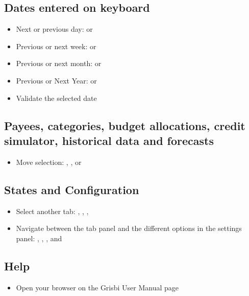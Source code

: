 \subsection{Dates entered on keyboard }

\begin{itemize}
	\item Next or previous day: \key{+} or \key{-}
	\item Previous or next week:  \key{+} or  \key{-}
	\item Previous or next month:  or 
	\item Previous or Next Year:   or  
	\item Validate the selected date 
\end{itemize}


\subsection{Payees, categories, budget allocations, credit simulator, historical data and forecasts}

\begin{itemize}
	\item Move selection: , ,  or 
\end{itemize}


\subsection{States and Configuration}

\begin{itemize}
	\item Select another tab: , , , 
	\item Navigate between the tab panel and the different options in the settings panel: , , ,  and 
\end{itemize}

\subsection{Help}

\begin{itemize}
	\item Open your browser on the Grisbi User Manual page 
\end{itemize}














